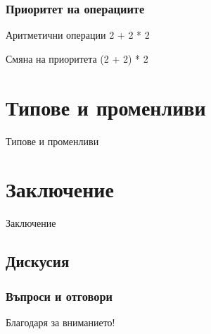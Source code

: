 \documentclass{beamer}
\begin{document}
\begin{frame}
\frametitle{Приоритет на операциите}
\begin{block}{Аритметични операции}
2 + 2 * 2
\end{block}
\begin{block}{Смяна на приоритета}
(2 + 2) * 2
\end{block}
\end{frame}

\section{Типове и променливи}

\begin{frame}
\center \huge{Типове и променливи}
\end{frame}

\subsection{}

\section{Заключение}

\begin{frame}
\center \huge{Заключение}
\end{frame}

\subsection{Дискусия}

\begin{frame}
\frametitle{Въпроси и отговори}
\center \huge{Благодаря за вниманието!}
\end{frame}
\end{document}
